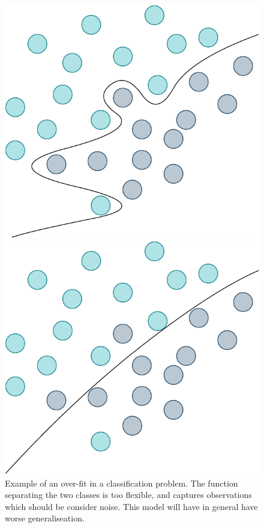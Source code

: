 \begin{figure}
  \begin{minipage}{.46\textwidth}
    \includegraphics[scale=0.5,width=\textwidth]{figures/over-fit-example}
    \caption{Example of an over-fit in a classification problem. The
      function separating the two classes is too flexible, and captures observations
      which should be consider noise. This model will have
      in general have worse generaliseation. }\label{fig:over-fit-example}
  \end{minipage}
  \hspace{5pt}
  \begin{minipage}{.46\textwidth}
    \includegraphics[scale=0.48,width=\textwidth]{figures/good-fit-example}

\end{minipage}
\end{figure}
